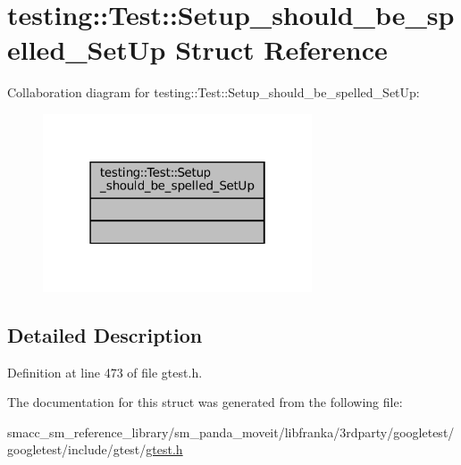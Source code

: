 \hypertarget{structtesting_1_1Test_1_1Setup__should__be__spelled__SetUp}{}\section{testing\+:\+:Test\+:\+:Setup\+\_\+should\+\_\+be\+\_\+spelled\+\_\+\+Set\+Up Struct Reference}
\label{structtesting_1_1Test_1_1Setup__should__be__spelled__SetUp}


Collaboration diagram for testing\+:\+:Test\+:\+:Setup\+\_\+should\+\_\+be\+\_\+spelled\+\_\+\+Set\+Up\+:
\nopagebreak
\begin{figure}[H]
\begin{center}
\leavevmode
\includegraphics[width=226pt]{structtesting_1_1Test_1_1Setup__should__be__spelled__SetUp__coll__graph}
\end{center}
\end{figure}


\subsection{Detailed Description}


Definition at line 473 of file gtest.\+h.



The documentation for this struct was generated from the following file\+:\begin{DoxyCompactItemize}
\item 
smacc\+\_\+sm\+\_\+reference\+\_\+library/sm\+\_\+panda\+\_\+moveit/libfranka/3rdparty/googletest/googletest/include/gtest/\hyperlink{gtest_8h}{gtest.\+h}\end{DoxyCompactItemize}
